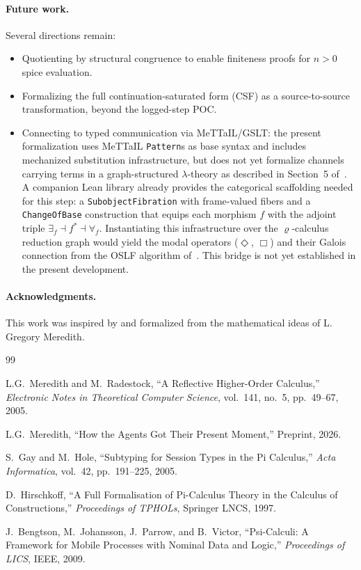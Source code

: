 \documentclass[11pt,a4paper]{article}
\theoremstyle{definition}
\theoremstyle{remark}
\renewcommand{\rho}{\varrho}
\newcommand{\lean}[1]{\lstinline[language=Lean4]{#1}}
\begin{document}
\paragraph{Future work.}
Several directions remain:
\begin{itemize}[nosep]
  \item Quotienting by structural congruence to enable finiteness proofs
    for $n > 0$ spice evaluation.
  \item Formalizing the full continuation-saturated form (CSF) as a
    source-to-source transformation, beyond the logged-step POC.
  \item Connecting to typed communication via MeTTaIL/GSLT: the present
    formalization uses MeTTaIL \lean{Pattern}s as base syntax and includes
    mechanized substitution infrastructure, but does not yet formalize
    channels carrying terms in a graph-structured $\lambda$-theory as
    described in Section~5 of~\cite{meredith2026spice}.
    A companion Lean library already provides the categorical scaffolding
    needed for this step: a \lean{SubobjectFibration} with frame-valued
    fibers and a \lean{ChangeOfBase} construction that equips each
    morphism $f$ with the adjoint triple $\exists_f \dashv f^* \dashv \forall_f$.
    Instantiating this infrastructure over the $\rho$-calculus reduction
    graph would yield the modal operators ($\Diamond$, $\Box$) and their
    Galois connection from the OSLF algorithm of~\cite{meredith2005}.
    This bridge is not yet established in the present development.
\end{itemize}

\paragraph{Acknowledgments.}
This work was inspired by and formalized from the mathematical ideas of
L. Gregory Meredith.

\begin{thebibliography}{99}

L.G.~Meredith and M.~Radestock,
``A Reflective Higher-Order Calculus,''
\textit{Electronic Notes in Theoretical Computer Science}, vol.~141, no.~5,
pp.~49--67, 2005.

L.G.~Meredith,
``How the Agents Got Their Present Moment,''
Preprint, 2026.

S.~Gay and M.~Hole,
``Subtyping for Session Types in the Pi Calculus,''
\textit{Acta Informatica}, vol.~42, pp.~191--225, 2005.

D.~Hirschkoff,
``A Full Formalisation of Pi-Calculus Theory in the Calculus of Constructions,''
\textit{Proceedings of TPHOLs}, Springer LNCS, 1997.

J.~Bengtson, M.~Johansson, J.~Parrow, and B.~Victor,
``Psi-Calculi: A Framework for Mobile Processes with Nominal Data and Logic,''
\textit{Proceedings of LICS}, IEEE, 2009.

\end{thebibliography}
\end{document}
